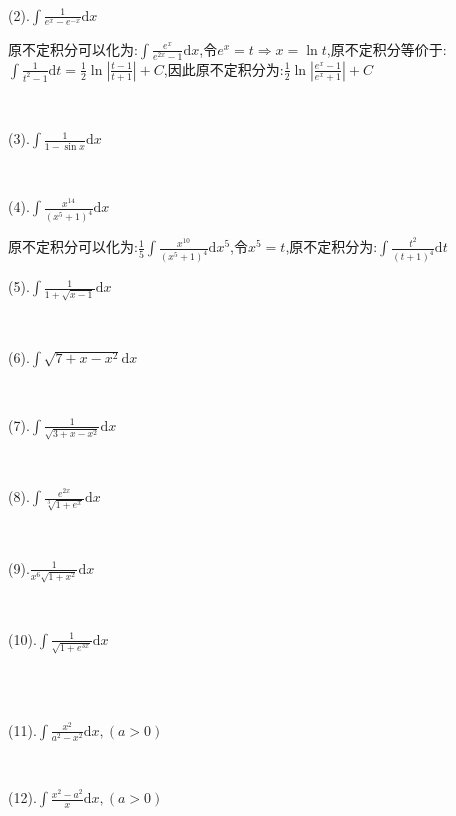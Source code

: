 \documentclass[oneside]{book}
\begin{document}
	\hspace{\fill}\
	
	(2).$\int \frac{1}{e^{x}-e^{-x}}\mathrm{d}x$
	
	原不定积分可以化为:$\int \frac{e^{x}}{e^{2x}-1}\mathrm{d}x$,令$e^{x}=t\Rightarrow x=\ln t$,原不定积分等价于:$\int \frac{1}{t^{2}-1}\mathrm{d}t=\frac{1}{2}\ln|\frac{t-1}{t+1}|+C$,因此原不定积分为:$\frac{1}{2}\ln|\frac{e^{x}-1}{e^{x}+1}|+C$
	
	\hspace{\fill}\
	
	(3).$\int \frac{1}{1-\sin x}\mathrm{d}x$
	
	\hspace{\fill}\
	
	(4).$\int \frac{x^{14}}{(x^{5}+1)^{4}}\mathrm{d}x$
	
	原不定积分可以化为:$\frac{1}{5}\int \frac{x^{10}}{(x^{5}+1)^{4}}\mathrm{d}x^{5}$,令$x^{5}=t$,原不定积分为:$\int \frac{t^{2}}{(t+1)^{4}}\mathrm{d}t$
	\hspace{\fill}\
	
	(5).$\int \frac{1}{1+\sqrt{x-1}}\mathrm{d}x$
	
	\hspace{\fill}\
	
	(6).$\int \sqrt{7+x-x^{2}}\mathrm{d}x$
	
	\hspace{\fill}\
	
	(7).$\int \frac{1}{\sqrt{3+x-x^{2}}}\mathrm{d}x$
	
	\hspace{\fill}\
	
	(8).$\int \frac{e^{2x}}{\sqrt[3]{1+e^{x}}}\mathrm{d}x$
	
	\hspace{\fill}\
	
	(9).$\frac{1}{x^{6}\sqrt{1+x^{2}}}\mathrm{d}x$
	
	\hspace{\fill}\
	
	(10).$\int \frac{1}{\sqrt{1+e^{3x}}}\mathrm{d}x$
	
	\hspace{\fill}\\\
	
	(11).$\int \frac{x^{2}}{a^{2}-x^{2}}\mathrm{d}x,(a>0)$
	
	\hspace{\fill}\
	
	(12).$\int \frac{x^{2}-a^{2}}{x}\mathrm{d}x,(a>0)$
	
	\hspace{\fill}\
	
\end{document}
